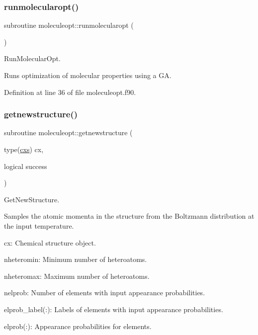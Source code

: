 \subsubsection{\texorpdfstring{runmolecularopt()}{runmolecularopt()}}
{\footnotesize\ttfamily subroutine moleculeopt\+::runmolecularopt (\begin{DoxyParamCaption}{ }\end{DoxyParamCaption})}



Run\+Molecular\+Opt. 

Runs optimization of molecular properties using a GA. 

Definition at line 36 of file moleculeopt.\+f90.

\mbox{\label{namespacemoleculeopt_ab418bbd775aed900cd65977242b325b3}} 
\subsubsection{\texorpdfstring{getnewstructure()}{getnewstructure()}}
{\footnotesize\ttfamily subroutine moleculeopt\+::getnewstructure (\begin{DoxyParamCaption}\item[{type(\mbox{\hyperlink{structchemstr_1_1cxs}{cxs}})}]{cx,  }\item[{logical}]{success }\end{DoxyParamCaption})}



Get\+New\+Structure. 

Samples the atomic momenta in the structure from the Boltzmann distribution at the input temperature.


\begin{DoxyItemize}
\item cx\+: Chemical structure object.
\item nheteromin\+: Minimum number of heteroatoms.
\item nheteromax\+: Maximum number of heteroatoms.
\item nelprob\+: Number of elements with input appearance probabilities.
\item elprob\+\_\+label(\+:)\+: Labels of elements with input appearance probabilities.
\item elprob(\+:)\+: Appearance probabilities for elements. 
\end{DoxyItemize}


